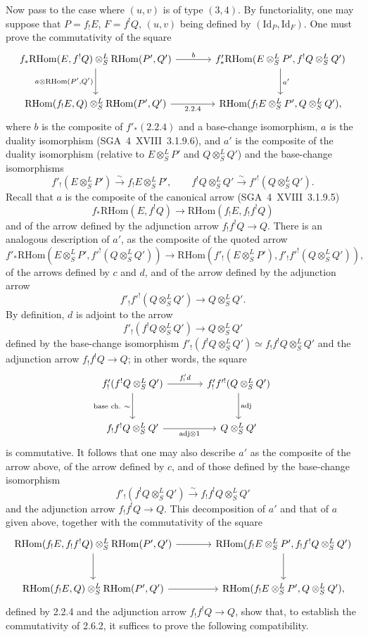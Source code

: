 \documentclass[11pt]{article}
\providecommand{\RHom}{\mathrm{RHom}}
\providecommand{\Id}{\mathrm{Id}}
\providecommand{\RHom}{\mathrm{RHom}}
\providecommand{\RHom}{\mathrm R\mathcal{H}om}
\providecommand{\RHom}{\mathrm{RHom}}
\begin{document}
Now pass to the case where $(u,v)$ is of type $(3,4)$. By functoriality, one may suppose that $P=f_{!}E$, $F=f^{!}Q$, $(u,v)$ being defined by $(\Id_P,\Id_F)$. One must prove the commutativity of the square
\[
\begin{tikzcd}[column sep=large,row sep=large]
f_*\RHom(E,f^!Q)\otimes^L_S\RHom(P',Q') \arrow[r,"b"] \arrow[d,"{a\otimes\RHom(P',Q')}"'] & f'_*\RHom(E\otimes^L_SP',f^!Q\otimes^L_SQ') \arrow[d,"a'"]\\
\RHom(f_!E,Q)\otimes^L_S\RHom(P',Q') \arrow[r,"2.2.4"'] & \RHom(f_!E\otimes^L_SP',Q\otimes^L_SQ'),
\end{tikzcd}
\]
where $b$ is the composite of $f'_*(2.2.4)$ and a base-change isomorphism, $a$ is the duality isomorphism (SGA~4~XVIII~3.1.9.6), and $a'$ is the composite of the duality isomorphism (relative to $E\otimes^L_SP'$ and $Q\otimes^L_SQ'$) and the base-change isomorphisms
\[
f'_!(E\otimes^L_SP')\xrightarrow{\sim}f_!E\otimes^L_SP',
\qquad
f^!Q\otimes^L_SQ'\xrightarrow{\sim}f'^!(Q\otimes^L_SQ').
\]
Recall that $a$ is the composite of the canonical arrow (SGA~4~XVIII~3.1.9.5)
\[
f_*\RHom(E,f^!Q)\longrightarrow\RHom(f_!E,f_!f^!Q)
\]
and of the arrow defined by the adjunction arrow $f_!f^!Q\to Q$. There is an analogous description of $a'$, as the composite of the quoted arrow
\[
f'_*\RHom(E\otimes^L_SP',f'^!(Q\otimes^L_SQ'))\longrightarrow
\RHom(f'_!(E\otimes^L_SP'),f'_!f'^!(Q\otimes^L_SQ')),
\]
of the arrows defined by $c$ and $d$, and of the arrow defined by the adjunction arrow
\[
f'_!f'^!(Q\otimes^L_SQ')\longrightarrow Q\otimes^L_SQ'.
\]
By definition, $d$ is adjoint to the arrow
\[
f'_!(f^!Q\otimes^L_SQ')\longrightarrow Q\otimes^L_SQ'
\]
defined by the base-change isomorphism $f'_!(f^!Q\otimes^L_SQ')\simeq f_!f^!Q\otimes^L_SQ'$ and the adjunction arrow $f_!f^!Q\to Q$; in other words, the square
\[
\begin{tikzcd}[column sep=large,row sep=large]
f'_!(f^!Q\otimes^L_SQ') \arrow[r,"{f'_!d}"] \arrow[d,"{\text{base ch.}\ \sim}"'] & f'_!f'^!(Q\otimes^L_SQ') \arrow[d,"\mathrm{adj}"]\\
f_!f^!Q\otimes^L_SQ' \arrow[r,"{\mathrm{adj}\otimes 1}"'] & Q\otimes^L_SQ'
\end{tikzcd}
\]
is commutative. It follows that one may also describe $a'$ as the composite of the arrow above, of the arrow defined by $c$, and of those defined by the base-change isomorphism
\[
f'_!(f^!Q\otimes^L_SQ')\xrightarrow{\sim}f_!f^!Q\otimes^L_SQ'
\]
and the adjunction arrow $f_!f^!Q\to Q$. This decomposition of $a'$ and that of $a$ given above, together with the commutativity of the square
\[
\begin{tikzcd}[column sep=large,row sep=large]
\RHom(f_!E,f_!f^!Q)\otimes^L_S\RHom(P',Q') \arrow[r] \arrow[d] & \RHom(f_!E\otimes^L_SP',f_!f^!Q\otimes^L_SQ') \arrow[d]\\
\RHom(f_!E,Q)\otimes^L_S\RHom(P',Q') \arrow[r] & \RHom(f_!E\otimes^L_SP',Q\otimes^L_SQ'),
\end{tikzcd}
\]
defined by 2.2.4 and the adjunction arrow $f_!f^!Q\to Q$, show that, to establish the commutativity of 2.6.2, it suffices to prove the following compatibility.
\end{document}
